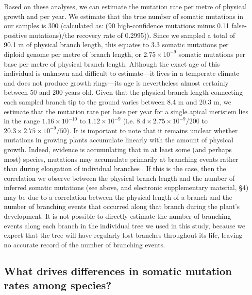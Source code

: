 Based on these analyses, we can estimate the mutation rate per metre of physical growth and per year. We estimate that the true number of somatic mutations in our samples is 300 (calculated as: (90 high-confidence mutations minus 0.11 false-positive mutations)/the recovery rate of 0.2995)). Since we sampled a total of 90.1 m of physical branch length, this equates to 3.3 somatic mutations per diploid genome per metre of branch length, or $2.75 \times 10^{-9}$ somatic mutations per base per metre of physical branch length. Although the exact age of this individual is unknown and difficult to estimate---it lives in a temperate climate and does not produce growth rings---its age is nevertheless almost certainly between 50 and 200 years old. Given that the physical branch length connecting each sampled branch tip to the ground varies between 8.4 m and 20.3 m, we estimate that the mutation rate per base per year for a single apical meristem lies in the range $1.16 \times 10^{-10}$ to $1.12 \times 10^{-9}$ (i.e. $8.4 \times 2.75 \times 10^{-9}/200$ to $20.3 \times 2.75 \times 10^{-9}/50$). It is important to note that it remains unclear whether mutations in growing plants accumulate linearly with the amount of physical growth. Indeed, evidence is accumulating that in at least some (and perhaps most) species, mutations may accumulate primarily at branching events rather than during elongation of individual branches \parencite{watson_germline_2016,burian_patterns_2016}. If this is the case, then the correlation we observe between the physical branch length and the number of inferred somatic mutations (see above, and electronic supplementary material, §4) may be due to a correlation between the physical length of a branch and the number of branching events that occurred along that branch during the plant's development. It is not possible to directly estimate the number of branching events along each branch in the individual tree we used in this study, because we expect that the tree will have regularly lost branches throughout its life, leaving no accurate record of the number of branching events.

\subsection{What drives differences in somatic mutation rates among species?}

